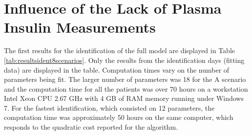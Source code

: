 \section{Influence of the Lack of Plasma Insulin Measurements}
\label{sec:IdentificationFromReferenceGlucose3}

The first results for the identification of the full model are displayed in Table \ref{tab:resultsident8scenarios}. Only the results from the identification days (fitting data) are displayed in the table. Computation times vary on the number of parameters being fit. The larger number of parameters was 18 for the A scenario and the computation time for all the patients was over 70 hours on a workstation Intel \textregistered Xeon \textregistered CPU 2.67 GHz with 4 GB of RAM memory running under Windows 7. For the fastest identification, which consisted on 12 parameters, the computation time was approximately 50 hours on the same computer, which responds to the quadratic cost reported for the algorithm.

